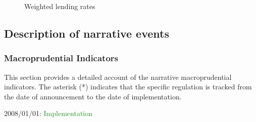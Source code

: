 \documentclass[
  letterpaper,
  DIV=11,
  numbers=noendperiod]{scrartcl}
\begin{document}
\begin{figure}[H]


\caption{\label{fig-bank_interest_rates}Weighted lending rates}

\end{figure}%

\newpage

\subsection{Description of narrative
events}\label{description-of-narrative-events}

\subsubsection{Macroprudential
Indicators}\label{macroprudential-indicators}

This section provides a detailed account of the narrative
macroprudential indicators. The asterisk (*) indicates that the specific
regulation is tracked from the date of announcement to the date of
implementation.

2008/01/01: \textcolor{ForestGreen}{Implementation}
\end{document}
